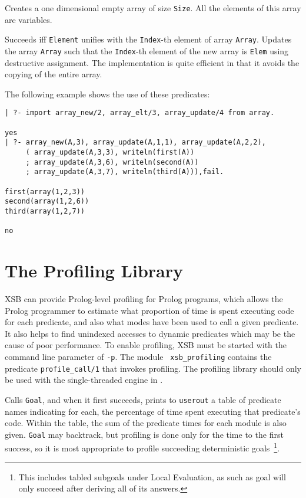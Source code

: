 \begin{description}
%
Creates a one dimensional empty array of size {\tt Size}.  All the
elements of this array are variables.  

%
Succeeds iff {\tt Element} unifies with the {\tt Index}-th element of
array {\tt Array}.  
%
%
Updates the array {\tt Array} such that the {\tt Index}-th element of
the new array is {\tt Elem} using destructive assignment.  The
implementation is quite efficient in that it avoids the copying of the
entire array.
\end{description}

The following example shows the use of these predicates:
{\footnotesize
\begin{verbatim}
| ?- import array_new/2, array_elt/3, array_update/4 from array.

yes
| ?- array_new(A,3), array_update(A,1,1), array_update(A,2,2),
     ( array_update(A,3,3), writeln(first(A))
     ; array_update(A,3,6), writeln(second(A))
     ; array_update(A,3,7), writeln(third(A))),fail.

first(array(1,2,3))
second(array(1,2,6))
third(array(1,2,7))

no
\end{verbatim}
}

\section{The Profiling Library} \label{sec:profile}

XSB can provide Prolog-level profiling for Prolog programs, which
allows the Prolog programmer to estimate what proportion of time is
spent executing code for each predicate, and also what modes have been
used to call a given predicate.  It also helps to find unindexed
accesses to dynamic predicates which may be the cause of poor
performance.  To enable profiling, XSB must be
started with the command line parameter of {\tt -p}.  The module {\tt
  xsb\_profiling} contains the predicate {\tt profile\_call/1} that
invokes profiling.  The profiling library should only be used with the
single-threaded engine in \version{}.

\begin{description}

Calls {\tt Goal}, and when it first succeeds, prints to {\tt userout}
a table of predicate names indicating for each, the percentage of time
spent executing that predicate's code.  Within the table, the sum of
the predicate times for each module is also given.  {\tt Goal} may
backtrack, but profiling is done only for the time to the first
success, so it is most appropriate to profile succeeding deterministic
goals~\footnote{This includes tabled subgoals under Local Evaluation,
  as such as goal will only succeed after deriving all of its
  answers.}.
\end{description}

